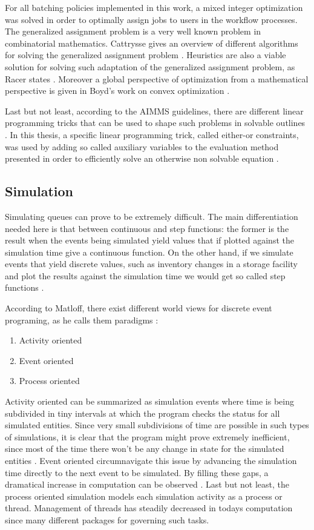 \documentclass{seal_thesis}
\begin{document}
For all batching policies implemented in this work, a mixed integer optimization was solved in order to optimally assign jobs to users in the workflow processes. The generalized assignment problem is a very well known problem in combinatorial mathematics. Cattrysse gives an overview of different algorithms for solving the generalized assignment problem \cite{Cattrysse1992}. Heuristics are also a viable solution for solving such adaptation of the generalized assignment problem, as Racer states \cite{Racer1994}. Moreover a global perspective of optimization from a mathematical perspective is given in Boyd's work on convex optimization \cite{Boyd2004}.

Last but not least, according to the AIMMS guidelines, there are different linear programming tricks that can be used to shape such problems in solvable outlines \cite{Bisschop2016}. In this thesis, a specific linear programming trick, called either-or constraints, was used by adding so called auxiliary variables to the evaluation method presented in order to efficiently solve an otherwise non solvable equation \cite[p. 77]{Bisschop2016}.

\subsection{Simulation}

Simulating queues can prove to be extremely difficult. The main differentiation needed here is that between continuous and step functions: the former is the result when the events being simulated yield values that if plotted against the simulation time give a continuous function. On the other hand, if we simulate events that yield discrete values, such as inventory changes in a storage facility and plot the results against the simulation time we would get so called step functions \cite{Matloff2008}.

According to Matloff, there exist different world views for discrete event programing, as he calls them paradigms \cite{Matloff2008}:

\begin{enumerate}
	\item Activity oriented
	\item Event oriented
	\item Process oriented
\end{enumerate}

Activity oriented can be summarized as simulation events where time is being subdivided in tiny intervals at which the program checks the status for all simulated entities. Since very small subdivisions of time are possible in such types of simulations, it is clear that the program might prove extremely inefficient, since most of the time there won't be any change in state for the simulated entities \cite{Matloff2008}. Event oriented circumnavigate this issue by advancing the simulation time directly to the next event to be simulated. By filling these gaps, a dramatical increase in computation can be observed \cite{Matloff2008}. Last but not least, the process oriented simulation models each simulation activity as a process or thread. Management of threads has steadily decreased in todays computation since many different packages for governing such tasks.
\end{document}

